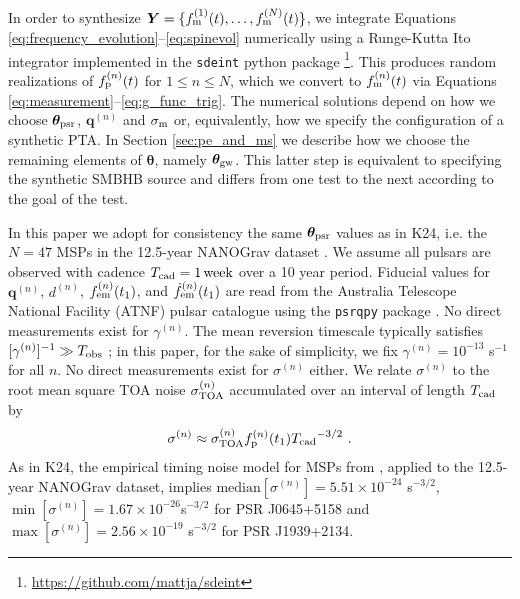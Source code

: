 \documentclass[fleqn,usenatbib,useAMS]{mnras}
\begin{document}
	In order to synthesize $\boldsymbol{Y} = \{f_{\rm m}^{(1)}(t), \dots, f_{\rm m}^{(N)}(t) \}$, we integrate Equations \eqref{eq:frequency_evolution}--\eqref{eq:spinevol} numerically using a Runge-Kutta It$\hat{\text{o}}$ integrator implemented in the \texttt{sdeint} python package \footnote{\url{https://github.com/mattja/sdeint}}. This produces random realizations of $f_{\rm p}^{(n)}(t)$ for $1\leq n \leq N$, which we convert to $f_{\rm m}^{(n)}(t)$ via Equations \eqref{eq:measurement}--\eqref{eq:g_func_trig}. The numerical solutions depend on how we choose $\boldsymbol{\theta}_{\rm psr}$, ${\boldsymbol{q}}^{(n)}$ and $\sigma_{\rm m}$ or, equivalently, how we specify the configuration of a synthetic PTA. In Section  \ref{sec:pe_and_ms} we describe how we choose the remaining elements of $\boldsymbol{\theta}$, namely $\boldsymbol{\theta}_{\rm gw}$. This latter step is equivalent to specifying the synthetic SMBHB source and differs from one test to the next according to the goal of the test.  \newline 
	
	
	In this paper we adopt for consistency the same $\boldsymbol{\theta}_{\rm psr}$ values as in K24, i.e. the $N=47$ MSPs in the 12.5-year NANOGrav dataset \citep{2020ApJ...905L..34A}. We assume all pulsars are observed with cadence $T_{\rm cad} = 1 \,{\rm week}$ over a 10 year period. Fiducial values for ${\boldsymbol{q}}^{(n)}$, $d^{(n)}$, $f_{\rm em}^{(n)}(t_1)$, and $\dot{f}^{(n)}_{\rm em}(t_1)$ are read from the Australia Telescope National Facility (ATNF) pulsar catalogue \citep{Manchester2005} using the \texttt{psrqpy} package \citep{psrqpy}. No direct measurements exist for $\gamma^{(n)}$. The mean reversion timescale typically satisfies $[\gamma^{(n)}]^{-1} \gg T_{\rm obs}$ \citep{Price2012,Myers2021MNRAS.502.3113M,Meyers2021,Vargas}; in this paper, for the sake of simplicity, we fix $\gamma^{(n)} = 10^{-13}$ s$^{-1}$ for all $n$. No direct measurements exist for $\sigma^{(n)}$ either. We relate $\sigma^{(n)}$ to the root mean square TOA noise $\sigma^{(n)}_{\rm TOA}$ accumulated over an interval of length $T_{\rm cad}$ by
	\begin{eqnarray}
		\sigma^{(n)} \approx \sigma_{\rm TOA}^{(n)} f_{\rm p}^{(n)}(t_1) {T_{\rm cad}}^{-3/2} \ . \label{eq:sigmap_f}
	\end{eqnarray}
	As in K24, the empirical timing noise model for MSPs from \cite{Shannon2010ApJ...725.1607S}, applied to the 12.5-year NANOGrav dataset, implies $\text{median} [\sigma^{(n)}] = 5.51 \times 10^{-24} $ s$^{-3/2}$, $\min [ \sigma^{(n)} ] = 1.67 \times 10^{-26}$s$^{-3/2}$ for PSR J0645+5158 and $\max [ \sigma^{(n)} ] = 2.56 \times 10^{-19}$ s$^{-3/2}$ for PSR J1939+2134. \newline 
	
\end{document}

